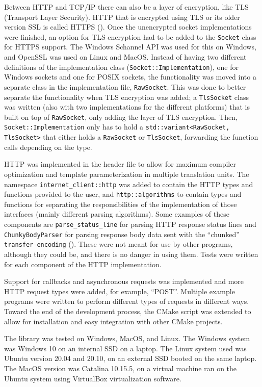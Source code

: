 \documentclass[12pt, a4paper]{article}
\begin{document}
Between HTTP and TCP/IP there can also be a layer of encryption, like TLS (Transport Layer Security). HTTP that is encrypted using TLS or its older version SSL is called HTTPS (\cite{HttpsGlossary}). Once the unencrypted socket implementations were finished, an option for TLS encryption had to be added to the \texttt{Socket} class for HTTPS support. The Windows Schannel API was used for this on Windows, and OpenSSL was used on Linux and MacOS. Instead of having two different definitions of the implementation class (\texttt{Socket::Implementation}), one for Windows sockets and one for POSIX sockets, the functionality was moved into a separate class in the implementation file, \texttt{RawSocket}. This was done to better separate the functionality when TLS encryption was added; a \texttt{TlsSocket} class was written (also with two implementations for the different platforms) that is built on top of \texttt{RawSocket}, only adding the layer of TLS encryption. Then, \texttt{Socket::Implementation} only has to hold a \texttt{std::variant<RawSocket, TlsSocket>} that either holds a \texttt{RawSocket} or \texttt{TlsSocket}, forwarding the function calls depending on the type.

HTTP was implemented in the header file to allow for maximum compiler optimization and template parameterization in multiple translation units. The namespace \texttt{internet\_client::http} was added to contain the HTTP types and functions provided to the user, and \texttt{http::algorithms} to contain types and functions for separating the responsibilities of the implementation of those interfaces (mainly different parsing algorithms). Some examples of these components are \texttt{parse\_status\_line} for parsing HTTP response status lines and \texttt{ChunkyBodyParser} for parsing response body data sent with the “chunked” \texttt{transfer-encoding} (\cite{HttpTransferEncoding}). These were not meant for use by other programs, although they could be, and there is no danger in using them. Tests were written for each component of the HTTP implementation.

Support for callbacks and asynchronous requests was implemented and more HTTP request types were added, for example, “POST”. Multiple example programs were written to perform different types of requests in different ways. Toward the end of the development process, the CMake script was extended to allow for installation and easy integration with other CMake projects.

The library was tested on Windows, MacOS, and Linux. The Windows system was Windows 10 on an internal SSD on a laptop. The Linux system used was Ubuntu version 20.04 and 20.10, on an external SSD booted on the same laptop. The MacOS version was Catalina 10.15.5, on a virtual machine ran on the Ubuntu system using VirtualBox virtualization software.
\end{document}
